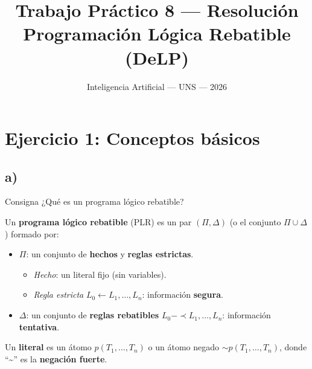 \documentclass[11pt,a4paper]{article}
\title{\vspace{-1.5cm}\textbf{Trabajo Práctico 8 --- Resolución}\\[3pt]
\large Programación Lógica Rebatible (DeLP)}
\author{\normalsize Inteligencia Artificial --- UNS --- 2026}
\date{}
\newcommand{\nf}{\textasciitilde}                 %
\newcommand{\reb}{\mathrel{-\!\!\!\prec}}         %
\newcommand{\est}{\leftarrow}                      %
\begin{document}
\maketitle
\vspace{-1cm}
\notafuentes

\indice

\section{Ejercicio 1: Conceptos básicos}

\subsection{a)}

\begin{enunciado}{Consigna}
¿Qué es un programa lógico rebatible?
\end{enunciado}

Un \textbf{programa lógico rebatible} (PLR) es un par $(\Pi, \Delta)$ (o el conjunto $\Pi \cup \Delta$) formado por:
\begin{itemize}
  \item $\Pi$: un conjunto de \textbf{hechos} y \textbf{reglas estrictas}.
  \begin{itemize}
    \item \textit{Hecho}: un literal fijo (sin variables).
    \item \textit{Regla estricta} $L_0 \est L_1, \dots, L_n$: información \textbf{segura}.
  \end{itemize}
  \item $\Delta$: un conjunto de \textbf{reglas rebatibles} $L_0 \reb L_1, \dots, L_n$: información \textbf{tentativa}.
\end{itemize}
Un \textbf{literal} es un átomo $p(T_1,\dots,T_n)$ o un átomo negado ${\sim}p(T_1,\dots,T_n)$, donde ``\nf'' es la \textbf{negación fuerte}.
\end{document}
